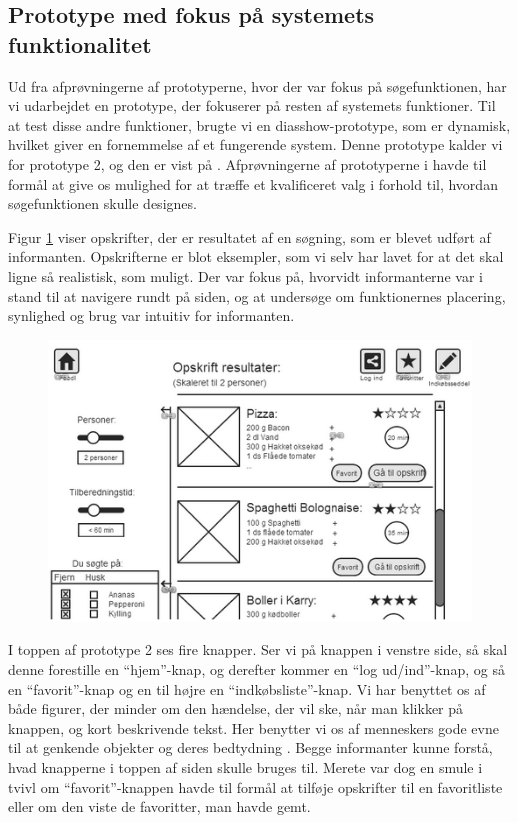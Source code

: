 \subsection{Prototype med fokus på systemets funktionalitet}
\label{subsec:prototype2}

Ud fra afprøvningerne af prototyperne, hvor der var fokus på søgefunktionen, har vi udarbejdet en prototype, der fokuserer på resten af systemets funktioner. Til at test disse andre funktioner, brugte vi en diasshow-prototype, som er dynamisk, hvilket giver en fornemmelse af et fungerende system. Denne prototype kalder vi for prototype 2, og den er vist på . Afprøvningerne af prototyperne i  havde til formål at give os mulighed for at træffe et kvalificeret valg i forhold til, hvordan søgefunktionen skulle designes. 

Figur \ref{fig:prototype2design} viser opskrifter, der er resultatet af en søgning, som er blevet udført af informanten. Opskrifterne er blot eksempler, som vi selv har lavet for at det skal ligne så realistisk, som muligt. Der var fokus på, hvorvidt informanterne var i stand til at navigere rundt på siden, og at undersøge om funktionernes placering, synlighed og brug var intuitiv for informanten.

\begin{figure}[H]
	\centering
	\includegraphics[scale=0.7]{billeder/prototyper/prototype2.png}
	\label{fig:prototype2design}
\end{figure}

I toppen af prototype 2 ses fire knapper. Ser vi på knappen i venstre side, så skal denne forestille en ``hjem''-knap, og derefter kommer en ``log ud/ind''-knap, og så en ``favorit''-knap og en til højre en ``indkøbsliste''-knap. Vi har benyttet os af både figurer, der minder om den hændelse, der vil ske, når man klikker på knappen, og kort beskrivende tekst. Her benytter vi os af menneskers gode evne til at genkende objekter og deres bedtydning \cite[s. ~340]{deb}. Begge informanter kunne forstå, hvad knapperne i toppen af siden skulle bruges til. Merete var dog en smule i tvivl om ``favorit''-knappen havde til formål at tilføje opskrifter til en favoritliste eller om den viste de favoritter, man havde gemt.

